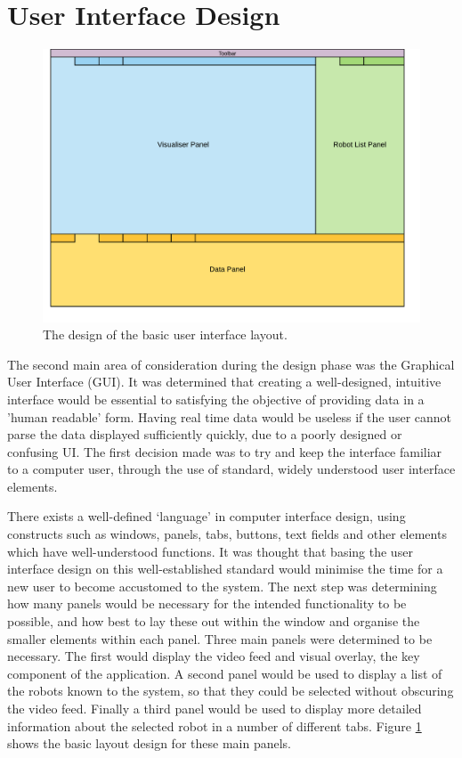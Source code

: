 \section{User Interface Design} \label{UserInterfaceDesign}
\begin{figure}[h]
	\centering
	\includegraphics[scale=1]{Figures/UILayout.png}
	\decoRule
	\caption[UI Layout]{The design of the basic user interface layout.}
	\label{fig:UILayout}
\end{figure}

The second main area of consideration during the design phase was the Graphical User Interface (GUI). It was determined that creating a well-designed, intuitive interface would be essential to satisfying the objective of providing data in a 'human readable' form. Having real time data would be useless if the user cannot parse the data displayed sufficiently quickly, due to a poorly designed or confusing UI. The first decision made was to try and keep the interface familiar to a computer user, through the use of standard, widely understood user interface elements. 

There exists a well-defined `language' in computer interface design, using constructs such as windows, panels, tabs, buttons, text fields and other elements which have well-understood functions. It was thought that basing the user interface design on this well-established standard would minimise the time for a new user to become accustomed to the system. The next step was determining how many panels would be necessary for the intended functionality to be possible, and how best to lay these out within the window and organise the smaller elements within each panel. Three main panels were determined to be necessary. The first would display the video feed and visual overlay, the key component of the application. A second panel would be used to display a list of the robots known to the system, so that they could be selected without obscuring the video feed. Finally a third panel would be used to display more detailed information about the selected robot in a number of different tabs. Figure \ref{fig:UILayout} shows the basic layout design for these main panels.

